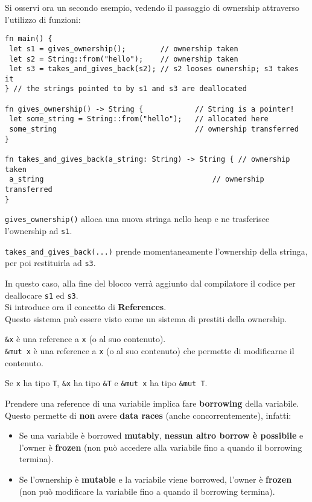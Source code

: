 \documentclass{article}
\begin{document}
\pagebreak

Si osservi ora un secondo esempio, vedendo il passaggio di ownership attraverso l'utilizzo di funzioni:
\begin{tcolorbox}
\begin{verbatim}
fn main() {
 let s1 = gives_ownership();        // ownership taken
 let s2 = String::from("hello");    // ownership taken
 let s3 = takes_and_gives_back(s2); // s2 looses ownership; s3 takes it
} // the strings pointed to by s1 and s3 are deallocated

fn gives_ownership() -> String {            // String is a pointer!
 let some_string = String::from("hello");   // allocated here
 some_string                                // ownership transferred
}

fn takes_and_gives_back(a_string: String) -> String { // ownership taken
 a_string                                       // ownership transferred
}
\end{verbatim}
\end{tcolorbox}
\texttt{gives\_ownership()} alloca una nuova stringa nello heap e ne trasferisce l'ownership ad \texttt{s1}.

\texttt{takes\_and\_gives\_back(...)} prende momentaneamente l'ownership della stringa, per poi restituirla ad \texttt{s3}.

In questo caso, alla fine del blocco verrà aggiunto dal compilatore il codice per deallocare \texttt{s1} ed \texttt{s3}.\vspace{14pt}\\
Si introduce ora il concetto di \textbf{References}.\\
Questo sistema può essere visto come un sistema di prestiti della ownership.

\texttt{\&x} è una reference a \texttt{x} (o al suo contenuto).\\
\texttt{\&mut x} è una reference a \texttt{x} (o al suo contenuto) che permette di modificarne il contenuto.

Se \texttt{x} ha tipo \texttt{T}, \texttt{\&x} ha tipo \texttt{\&T} e \texttt{\&mut x} ha tipo \texttt{\&mut T}.

Prendere una reference di una variabile implica fare \textbf{borrowing} della variabile. Questo permette di \textbf{non} avere \textbf{data races} (anche concorrentemente), infatti:
\begin{itemize}
    \item Se una variabile è borrowed \textbf{mutably}, \textbf{nessun altro borrow è possibile} e l’owner è \textbf{frozen} (non può accedere alla variabile fino a quando il borrowing termina).
    \item Se l’ownership è \textbf{mutable} e la variabile viene borrowed, l’owner è \textbf{frozen} (non può modificare la variabile fino a quando il borrowing termina).
\end{itemize}
\end{document}
